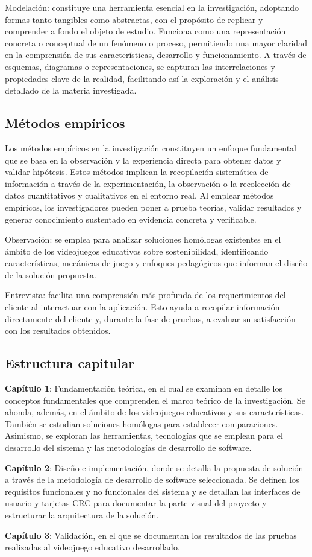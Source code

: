 Modelación: constituye una herramienta esencial en la investigación, adoptando formas tanto tangibles como abstractas, con el propósito de replicar y comprender a fondo el objeto de estudio. Funciona como una representación concreta o conceptual de un fenómeno o proceso, permitiendo una mayor claridad en la comprensión de sus características, desarrollo y funcionamiento. A través de esquemas, diagramas o representaciones, se capturan las interrelaciones y propiedades clave de la realidad, facilitando así la exploración y el análisis detallado de la materia investigada.

\subsection*{Métodos empíricos}

Los métodos empíricos en la investigación constituyen un enfoque fundamental que se basa en la observación y la experiencia directa para obtener datos y validar hipótesis. Estos métodos implican la recopilación sistemática de información a través de la experimentación, la observación o la recolección de datos cuantitativos y cualitativos en el entorno real. Al emplear métodos empíricos, los investigadores pueden poner a prueba teorías, validar resultados y generar conocimiento sustentado en evidencia concreta y verificable.

Observación: se emplea para analizar soluciones homólogas existentes en el ámbito de los videojuegos educativos sobre sostenibilidad, identificando características, mecánicas de juego y enfoques pedagógicos que informan el diseño de la solución propuesta.

Entrevista: facilita una comprensión más profunda de los requerimientos del cliente al interactuar con la aplicación. Esto ayuda a recopilar información directamente del cliente y, durante la fase de pruebas, a evaluar su satisfacción con los resultados obtenidos.

\subsection*{Estructura capitular}

\textbf{Capítulo 1}: Fundamentación teórica, en el cual se examinan en detalle los conceptos fundamentales que comprenden el marco teórico de la investigación. Se ahonda, además, en el ámbito de los videojuegos educativos y sus características. También se estudian soluciones homólogas para establecer comparaciones. Asimismo, se exploran las herramientas, tecnologías que se emplean para el desarrollo del sistema y las metodologías de desarrollo de software.

\textbf{Capítulo 2}: Diseño e implementación, donde se detalla la propuesta de solución a través de la metodología de desarrollo de software seleccionada. Se definen los requisitos funcionales y no funcionales del sistema y se detallan las interfaces de usuario y tarjetas CRC para documentar la parte visual del proyecto y estructurar la arquitectura de la solución.

\textbf{Capítulo 3}: Validación, en el que se documentan los resultados de las pruebas realizadas al videojuego educativo desarrollado.

